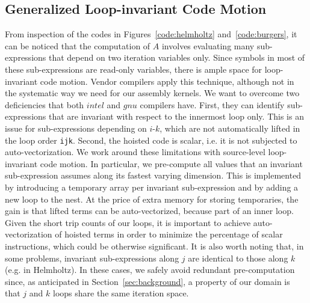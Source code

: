 \documentclass[conference]{IEEEtran}
\begin{document}
\subsection{Generalized Loop-invariant Code Motion}
\label{sec:code-transf-licm}
From inspection of the codes in Figures~\ref{code:helmholtz} and~\ref{code:burgers}, it can be noticed that the computation of $A$ involves evaluating many sub-expressions that depend on two iteration variables only. Since symbols in most of these sub-expressions are read-only variables, there is ample space for loop-invariant code motion. Vendor compilers apply this technique, although not in the systematic way we need for our assembly kernels. We want to overcome two deficiencies that both $intel$ and $gnu$ compilers have. First, they can identify sub-expressions that are invariant with respect to the innermost loop only. This is an issue for sub-expressions depending on $i$-$k$, which are not automatically lifted in the loop order \texttt{ijk}. Second, the hoisted code is scalar, i.e. it is not subjected to auto-vectorization. We work around these limitations with source-level loop-invariant code motion. In particular, we pre-compute all values that an invariant sub-expression assumes along its fastest varying dimension. This is implemented by introducing a temporary array per invariant sub-expression and by adding a new loop to the nest. At the price of extra memory for storing temporaries, the gain is that lifted terms can be auto-vectorized, because part of an inner loop. Given the short trip counts of our loops, it is important to achieve auto-vectorization of hoisted terms in order to minimize the percentage of scalar instructions, which could be otherwise significant. It is also worth noting that, in some problems, invariant sub-expressions along $j$ are identical to those along $k$ (e.g. in Helmholtz). In these cases, we safely avoid redundant pre-computation since, as anticipated in Section~\ref{sec:background}, a property of our domain is that $j$ and $k$ loops share the same iteration space.
\end{document}
